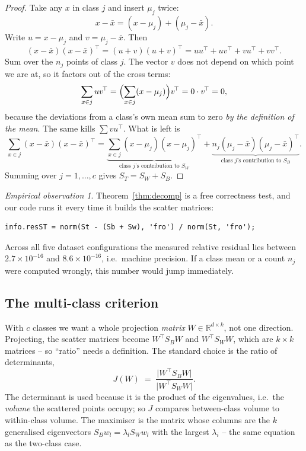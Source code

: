 \documentclass[11pt]{article}
\theoremstyle{definition}
\theoremstyle{remark}
\newtheorem*{observation}{Empirical observation}
\newcommand{\Sw}{S_W}
\newcommand{\Sb}{S_B}
\newcommand{\St}{S_T}
\newcommand{\R}{\mathbb{R}}
\begin{document}
\begin{proof}
Take any $x$ in class $j$ and insert $\mu_j$ twice:
\[
  x-\bar{x} = (x-\mu_j) + (\mu_j-\bar{x}).
\]
Write $u=x-\mu_j$ and $v=\mu_j-\bar{x}$. Then
\[
  (x-\bar{x})(x-\bar{x})^{\!\top} = (u+v)(u+v)^{\!\top} = uu^{\!\top} + uv^{\!\top} + vu^{\!\top} + vv^{\!\top}.
\]
Sum over the $n_j$ points of class $j$. The vector $v$ does not depend on which
point we are at, so it factors out of the cross terms:
\[
  \sum_{x\in j} uv^{\!\top} = \Bigl(\sum_{x\in j}(x-\mu_j)\Bigr)v^{\!\top} = 0\cdot v^{\!\top} = 0,
\]
because the deviations from a class's own mean sum to zero \emph{by the definition
of the mean}. The same kills $\sum vu^{\!\top}$. What is left is
\[
  \sum_{x\in j}(x-\bar{x})(x-\bar{x})^{\!\top} = \underbrace{\sum_{x\in j}(x-\mu_j)(x-\mu_j)^{\!\top}}_{\text{class $j$'s contribution to }\Sw} + \underbrace{n_j (\mu_j-\bar{x})(\mu_j-\bar{x})^{\!\top}}_{\text{class $j$'s contribution to }\Sb}.
\]
Summing over $j=1,\dots,c$ gives $\St=\Sw+\Sb$.
\end{proof}

\begin{observation}
Theorem~\ref{thm:decomp} is a free correctness test, and our code runs it every
time it builds the scatter matrices:
\begin{lstlisting}
info.resST = norm(St - (Sb + Sw), 'fro') / norm(St, 'fro');
\end{lstlisting}
Across all five dataset configurations the measured relative residual lies between
$2.7\times10^{-16}$ and $8.6\times10^{-16}$, i.e.\ machine precision. If a class
mean or a count $n_j$ were computed wrongly, this number would jump immediately.
\end{observation}

\subsection{The multi-class criterion}

With $c$ classes we want a whole projection \emph{matrix} $W\in\R^{d\times k}$, not
one direction. Projecting, the scatter matrices become $W^{\!\top}\Sb W$ and
$W^{\!\top}\Sw W$, which are $k\times k$ matrices -- so ``ratio'' needs a definition.
The standard choice is the ratio of determinants,
\[
  J(W) \;=\; \frac{\bigl|W^{\!\top}\Sb W\bigr|}{\bigl|W^{\!\top}\Sw W\bigr|} .
\]
The determinant is used because it is the product of the eigenvalues, i.e.\ the
\emph{volume} the scattered points occupy; so $J$ compares between-class volume to
within-class volume. The maximiser is the matrix whose columns are the $k$
generalised eigenvectors $\Sb w_l = \lambda_l \Sw w_l$ with the largest
$\lambda_i$ -- the same equation as the two-class case.
\end{document}
